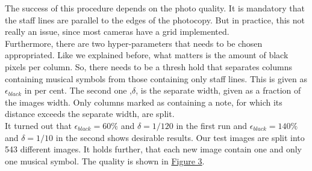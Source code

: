 \documentclass[twocolumn]{article}
\begin{document}
The success of this procedure depends on the photo quality. It is mandatory that the staff lines are parallel to the edges of the photocopy. But in practice, this not really an issue, since most cameras have a grid implemented. \\
Furthermore, there are two hyper-parameters that needs to be chosen appropriated. Like we explained before, what matters is the amount of black pixels per column. So, there needs to be a thresh hold that separates columns containing musical symbols from those containing only staff lines. This is given as $\epsilon_{black}$ in per cent. The second one ,$\delta$, is the separate width, given as a fraction of the images width. Only columns marked as containing a note, for which its distance exceeds the separate width, are split. \\
It turned out that $\epsilon_{black} = 60\% $ and $\delta = 1/120$ in the first run and $\epsilon_{black} = 140\%$ and $\delta = 1/10$ in the second shows desirable results. Our test images are split into 543 different images. It holds further, that each new image contain one and only one musical symbol. The quality is shown in \hyperref[quality]{Figure 3}.
\end{document}

